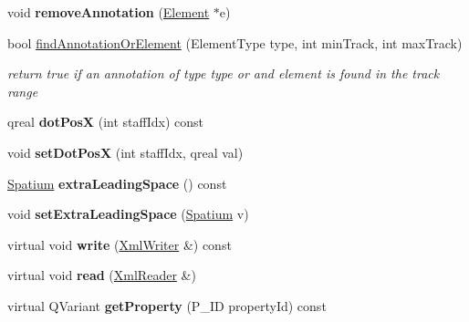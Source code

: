 \begin{DoxyCompactItemize}
void {\bfseries remove\+Annotation} (\hyperlink{class_ms_1_1_element}{Element} $\ast$e)
\item 
\mbox{\label{class_ms_1_1_segment_ab969554098db656cb4a24780a12bb529}} 
bool \hyperlink{class_ms_1_1_segment_ab969554098db656cb4a24780a12bb529}{find\+Annotation\+Or\+Element} (Element\+Type type, int min\+Track, int max\+Track)
\begin{DoxyCompactList}\small\item\em return true if an annotation of type type or and element is found in the track range \end{DoxyCompactList}\item 
\mbox{\label{class_ms_1_1_segment_afde517eb0b39a5f649e25fc929038e7a}} 
qreal {\bfseries dot\+PosX} (int staff\+Idx) const
\item 
\mbox{\label{class_ms_1_1_segment_a3d52cb81e00336d49938b6e43e96ead3}} 
void {\bfseries set\+Dot\+PosX} (int staff\+Idx, qreal val)
\item 
\mbox{\label{class_ms_1_1_segment_aa9b27fc6059b2bb530fd5965166c5f40}} 
\hyperlink{class_ms_1_1_spatium}{Spatium} {\bfseries extra\+Leading\+Space} () const
\item 
\mbox{\label{class_ms_1_1_segment_a72a1fb2ab890728fb72c91e7c3d3048d}} 
void {\bfseries set\+Extra\+Leading\+Space} (\hyperlink{class_ms_1_1_spatium}{Spatium} v)
\item 
\mbox{\label{class_ms_1_1_segment_a5f12df06ccd1addfeb4ba252f9c943d6}} 
virtual void {\bfseries write} (\hyperlink{class_ms_1_1_xml_writer}{Xml\+Writer} \&) const
\item 
\mbox{\label{class_ms_1_1_segment_a505cda3f4db10e87f115e603ce3f3736}} 
virtual void {\bfseries read} (\hyperlink{class_ms_1_1_xml_reader}{Xml\+Reader} \&)
\item 
\mbox{\label{class_ms_1_1_segment_a806bbfbaa3c8534ecbbaf47bbccdbf15}} 
virtual Q\+Variant {\bfseries get\+Property} (P\+\_\+\+ID property\+Id) const
\item 
\mbox{\label{class_ms_1_1_segment_a9bbe13c0e6748d2ccd1263f662c3a775}} 

\end{DoxyCompactItemize}

